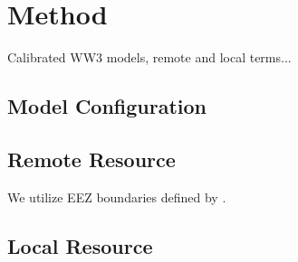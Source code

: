 \section{Method}

Calibrated WW3 models, remote and local terms...

\subsection{Model Configuration}

\subsection{Remote Resource}

We utilize EEZ boundaries defined by \citep[]{flandersmarineinstituteMaritimeBoundariesGeodatabase}.

\subsection{Local Resource}

